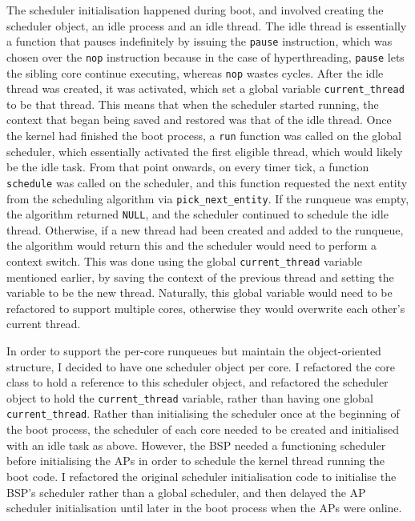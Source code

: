\documentclass[bsc,frontabs,singlespacing,parskip,deptreport]{infthesis}
\begin{document}
The scheduler initialisation happened during boot, and involved creating the scheduler object, an idle process and an idle thread. The idle thread is essentially a function that pauses indefinitely by issuing the \verb|pause| instruction, which was chosen over the \verb|nop| instruction because in the case of hyperthreading,  \verb|pause| lets the sibling core continue executing, whereas \verb|nop| wastes cycles. After the idle thread was created, it was activated, which set a global variable \verb|current_thread| to be that thread. This means that when the scheduler started running, the context that began being saved and restored was that of the idle thread. Once the kernel had finished the boot process, a \verb|run| function was called on the global scheduler, which essentially activated the first eligible thread, which would likely be the idle task. From that point onwards, on every timer tick, a function \verb|schedule| was called on the scheduler, and this function requested the next entity from the scheduling algorithm via \verb|pick_next_entity|. If the runqueue was empty, the algorithm returned \verb|NULL|, and the scheduler continued to schedule the idle thread. Otherwise, if a new thread had been created and added to the runqueue, the algorithm would return this and the scheduler would need to perform a context switch. This was done using the global \verb|current_thread| variable mentioned earlier, by saving the context of the previous thread and setting the variable to be the new thread. Naturally, this global variable would need to be refactored to support multiple cores, otherwise they would overwrite each other's current thread.

In order to support the per-core runqueues but maintain the object-oriented structure, I decided to have one scheduler object per core. I refactored the core class to hold a reference to this scheduler object, and refactored the scheduler object to hold the \verb|current_thread| variable, rather than having one global \verb|current_thread|. Rather than initialising the scheduler once at the beginning of the boot process, the scheduler of each core needed to be created and initialised with an idle task as above. However, the BSP needed a functioning scheduler before initialising the APs in order to schedule the kernel thread running the boot code. I refactored the original scheduler initialisation code to initialise the BSP's scheduler rather than a global scheduler, and then delayed the AP scheduler initialisation until later in the boot process when the APs were online.
\end{document}
